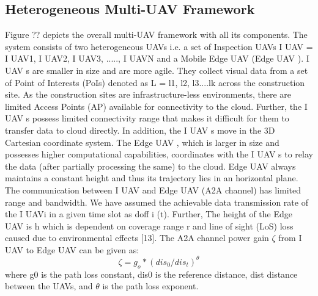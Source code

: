 \documentclass{article}
\begin{document}
\begin{multicols}{2}
\section{Heterogeneous Multi-UAV Framework}
Figure ?? depicts the overall multi-UAV framework with
all its components. The system consists of two heterogeneous
UAVs i.e. a set of Inspection UAVs I UAV =
{I UAV1, I UAV2, I UAV3, ....., I UAVN} and a Mobile
Edge UAV (Edge UAV ). I UAV s are smaller in size and
are more agile. They collect visual data from a set of
Point of Interests (PoIs) denoted as L = {l1, l2, l3....lk}
across the construction site. As the construction sites are
infrastructure-less environments, there are limited Access
Points (AP) available for connectivity to the cloud. Further,
the I UAV s possess limited connectivity range that
makes it difficult for them to transfer data to cloud directly.
In addition, the I UAV s move in the 3D Cartesian
coordinate system. The Edge UAV , which is larger in size
and possesses higher computational capabilities, coordinates
with the I UAV s to relay the data (after partially
processing the same) to the cloud. Edge UAV always
maintains a constant height and thus its trajectory lies in
an horizontal plane.
The communication between I UAV and Edge UAV
(A2A channel) has limited range and bandwidth. We
have assumed the achievable data transmission rate of
the I UAVi in a given time slot as doff
i (t). Further, The
height of the Edge UAV is h which is dependent on coverage
range r and line of sight (LoS) loss caused due to
environmental effects [13].
The A2A channel power gain $\zeta$ from I UAV to
Edge UAV can be given as: 
\begin{equation}
    \zeta = g_o * (dis_0/dis_t)^\theta
\end{equation}
where g0 is the path loss constant, dis0 is the reference
distance, dist distance between the UAVs, and $\theta$ is the
path loss exponent.

\end{multicols}
\end{document}
